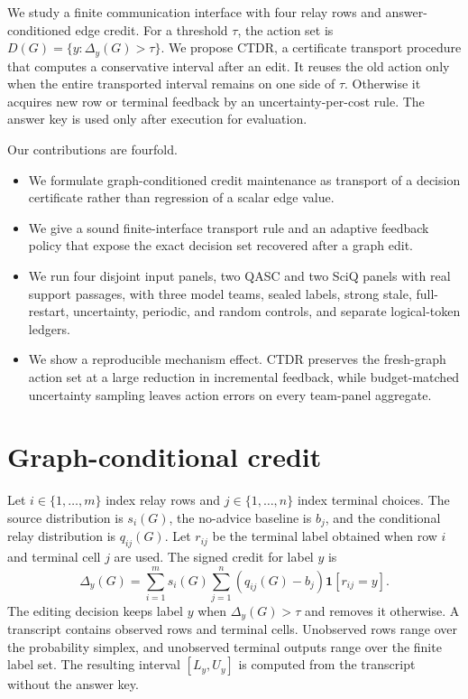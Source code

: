\documentclass[11pt]{article}
\newcommand{\ctdr}{\textsc{CTDR}}
\begin{document}
We study a finite communication interface with four relay rows and answer-conditioned edge credit. For a threshold $\tau$, the action set is $D(G)=\{y:\Delta_y(G)>\tau\}$. We propose \ctdr, a certificate transport procedure that computes a conservative interval after an edit. It reuses the old action only when the entire transported interval remains on one side of $\tau$. Otherwise it acquires new row or terminal feedback by an uncertainty-per-cost rule. The answer key is used only after execution for evaluation.

Our contributions are fourfold.
\begin{itemize}
\item We formulate graph-conditioned credit maintenance as transport of a decision certificate rather than regression of a scalar edge value.
\item We give a sound finite-interface transport rule and an adaptive feedback policy that expose the exact decision set recovered after a graph edit.
\item We run four disjoint input panels, two QASC and two SciQ panels with real support passages, with three model teams, sealed labels, strong stale, full-restart, uncertainty, periodic, and random controls, and separate logical-token ledgers.
\item We show a reproducible mechanism effect. \ctdr{} preserves the fresh-graph action set at a large reduction in incremental feedback, while budget-matched uncertainty sampling leaves action errors on every team-panel aggregate.
\end{itemize}

\section{Graph-conditional credit}
Let $i\in\{1,\ldots,m\}$ index relay rows and $j\in\{1,\ldots,n\}$ index terminal choices. The source distribution is $s_i(G)$, the no-advice baseline is $b_j$, and the conditional relay distribution is $q_{ij}(G)$. Let $r_{ij}$ be the terminal label obtained when row $i$ and terminal cell $j$ are used. The signed credit for label $y$ is
\begin{equation}
\Delta_y(G)=\sum_{i=1}^{m}s_i(G)\sum_{j=1}^{n}\left(q_{ij}(G)-b_j\right)\mathbf{1}[r_{ij}=y].
\end{equation}
The editing decision keeps label $y$ when $\Delta_y(G)>\tau$ and removes it otherwise. A transcript contains observed rows and terminal cells. Unobserved rows range over the probability simplex, and unobserved terminal outputs range over the finite label set. The resulting interval $[L_y,U_y]$ is computed from the transcript without the answer key.
\end{document}
